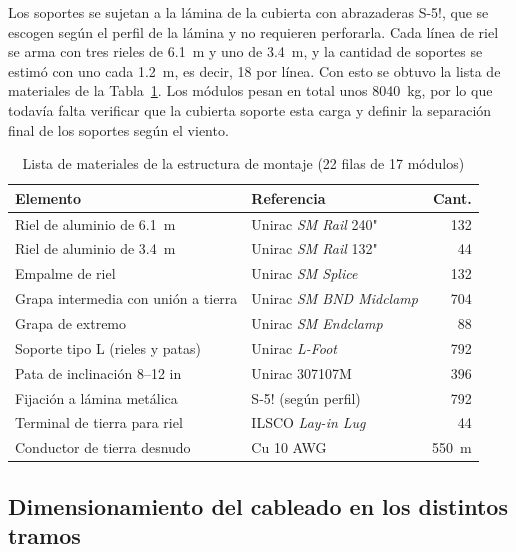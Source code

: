 Los soportes se sujetan a la lámina de la cubierta con abrazaderas S-5!, que se escogen según el perfil de la lámina y no requieren perforarla. Cada línea de riel se arma con tres rieles de \SI{6.1}{m} y uno de \SI{3.4}{m}, y la cantidad de soportes se estimó con uno cada \SI{1.2}{m}, es decir, 18 por línea. Con esto se obtuvo la lista de materiales de la Tabla~\ref{tab:montaje}. Los módulos pesan en total unos \SI{8040}{kg}, por lo que todavía falta verificar que la cubierta soporte esta carga y definir la separación final de los soportes según el viento.

\begin{table}[!htb]
\caption{Lista de materiales de la estructura de montaje (22 filas de 17 módulos)}
\label{tab:montaje}
\centering
\footnotesize
\setlength{\tabcolsep}{3pt}
\begin{tabular}{l l r}
\toprule
Elemento & Referencia & Cant. \\
\midrule
Riel de aluminio de \SI{6.1}{m} & Unirac \textit{SM Rail} 240" & 132 \\
Riel de aluminio de \SI{3.4}{m} & Unirac \textit{SM Rail} 132" & 44 \\
Empalme de riel & Unirac \textit{SM Splice} & 132 \\
Grapa intermedia con unión a tierra & Unirac \textit{SM BND Midclamp} & 704 \\
Grapa de extremo & Unirac \textit{SM Endclamp} & 88 \\
Soporte tipo L (rieles y patas) & Unirac \textit{L-Foot} & 792 \\
Pata de inclinación 8--12 in & Unirac 307107M & 396 \\
Fijación a lámina metálica & S-5! (según perfil) & 792 \\
Terminal de tierra para riel & ILSCO \textit{Lay-in Lug} & 44 \\
Conductor de tierra desnudo & Cu 10 AWG & \SI{550}{m} \\
\bottomrule
\end{tabular}
\end{table}

\subsection{Dimensionamiento del cableado en los distintos tramos}


